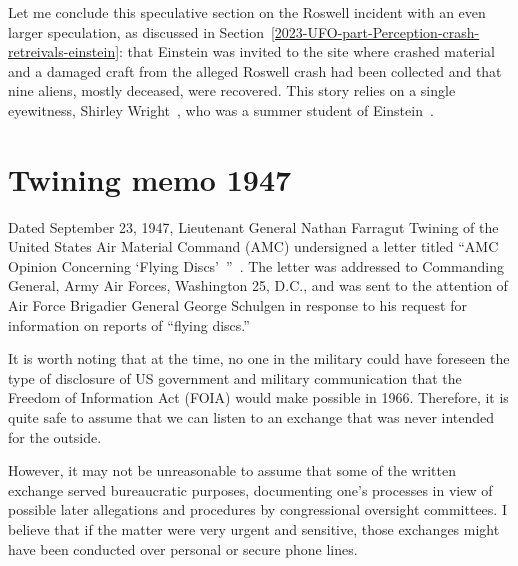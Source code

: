 Let me conclude this speculative section on the Roswell incident with an even larger speculation, as discussed in Section~\ref{2023-UFO-part-Perception-crash-retreivals-einstein}: that Einstein was invited to the site where crashed material and a damaged craft from the alleged Roswell crash had been collected and that nine aliens, mostly deceased, were recovered. This story relies on a single eyewitness, Shirley Wright~\cite{ShirleyWrightObituaryLegacy2015Jul}, who was a summer student of Einstein~\cite{BragaliaEinstein}.


\section{Twining memo 1947}

\label{2023-UFO-part-History-chapter-post-1945-pre-1953.tex-tm1947}



Dated September 23, 1947, Lieutenant General Nathan Farragut Twining of the United States Air Material Command (AMC) undersigned a letter titled ``AMC Opinion Concerning `Flying Discs'~''~\cite{Zabel2022Mar}. The letter was addressed to Commanding General, Army Air Forces, Washington 25, D.C., and was sent to the attention of Air Force Brigadier General George Schulgen in response to his request for information on reports of ``flying discs.''

It is worth noting that at the time, no one in the military could have foreseen the type of disclosure of US government and military communication that the Freedom of Information Act (FOIA) would make possible in 1966. Therefore, it is quite safe to assume that we can listen to an exchange that was never intended for the outside.

However, it may not be unreasonable to assume that some of the written exchange served bureaucratic purposes, documenting one's processes in view of possible later allegations and procedures by congressional oversight committees. I believe that if the matter were very urgent and sensitive, those exchanges might have been conducted over personal or secure phone lines.

